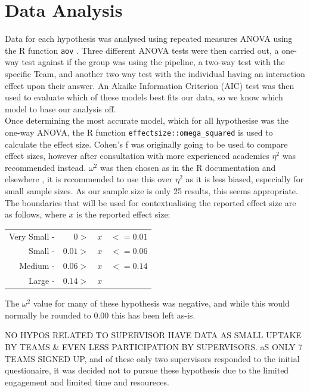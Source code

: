 \documentclass[journal]{IEEEtran}
\begin{document}
\lstset{language = R}
\section{Data Analysis}
    Data for each hypothesis was analysed using repeated measures ANOVA \cite{carvadiaANOVA} using the R function \lstinline{aov} \cite{RaovDocs}. Three different ANOVA tests were then carried out, a one-way test against if the group was using the pipeline, a two-way test with the specific Team, and another two way test with the individual having an interaction effect upon their answer. An Akaike Information Criterion (AIC) \cite{AIC} test was then used to evaluate which of these models best fits our data, so we know which model to base our analysis off. \\
    Once determining the most accurate model, which for all hypothesise was the one-way ANOVA, the R function \lstinline{effectsize::omega_squared}\cite{RcohensfDocs} is used to calculate the effect size. Cohen's f was originally going to be used to compare effect sizes, however after consultation with more experienced academics $\eta^2$ was recommended instead. $\omega^2$ was then chosen as in the R documentation and elsewhere \cite{RcohensfDocs, statHowToOmegaSquared,ALBERS2018187}, it is recommended to use this over $\eta^2$ as it is less biased, especially for small sample sizes. As our sample size is only 25 results, this seems appropriate. The boundaries that will be used for contextualising the reported effect size are as follows\cite{field2013discovering}, where $x$ is the reported effect size:

    \begin{tabularx}{\linewidth}{r r c l}
        Very Small - & $0 > $ & $ x $ & $<=0.01$ \\
        Small - & $0.01 > $ & $ x $ & $<=0.06$ \\
        Medium - & $0.06 > $ & $ x $ & $<=0.14$ \\
        Large - & $0.14 > $ & $ x $ &  
    \end{tabularx}

    The $\omega^2$ value for many of these hypothesis was negative, and while this would normally be rounded to 0.00 this has been left as-is\cite{okada2017negative}.

    NO HYPOS RELATED TO SUPERVISOR HAVE DATA AS SMALL UPTAKE BY TEAMS \& EVEN LESS PARTICIPATION BY SUPERVISORS. aS ONLY 7 TEAMS SIGNED UP, and of these only two supervisors responded to the initial questionaire, it was decided not to pursue these hypothesis due to the limited engagement and limited time and resoureces.
\end{document}
